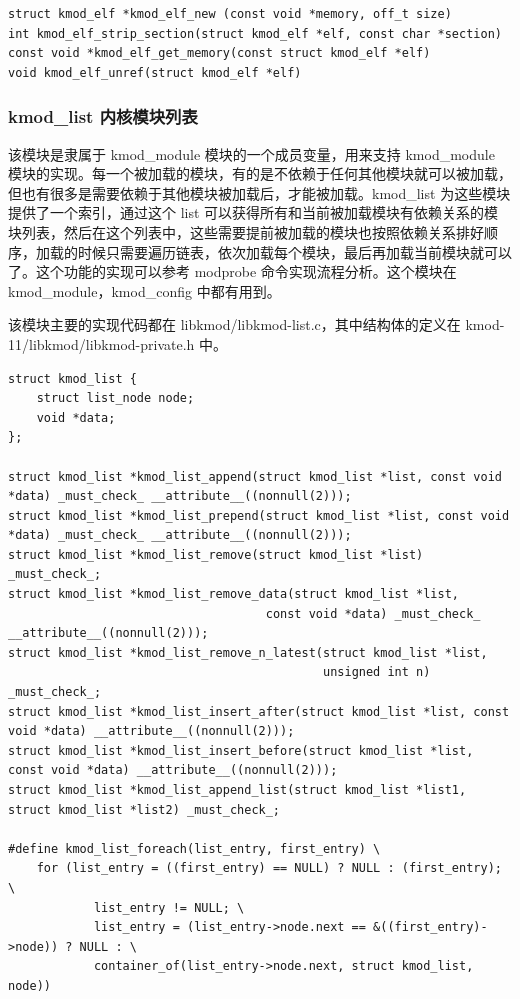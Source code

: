 \documentclass[11pt,a4paper]{article}
\begin{document}
{\begin{shaded}\begin{verbatim}
struct kmod_elf *kmod_elf_new (const void *memory, off_t size)
int kmod_elf_strip_section(struct kmod_elf *elf, const char *section)
const void *kmod_elf_get_memory(const struct kmod_elf *elf)
void kmod_elf_unref(struct kmod_elf *elf)
\end{verbatim}\end{shaded}}
\subsubsection{kmod\_list 内核模块列表}

该模块是隶属于 kmod\_module 模块的一个成员变量，用来支持 kmod\_module
模块的实现。每一个被加载的模块，有的是不依赖于任何其他模块就可以被加载，但也有很多是需要依赖于其他模块被加载后，才能被加载。kmod\_list
为这些模块提供了一个索引，通过这个 list
可以获得所有和当前被加载模块有依赖关系的模块列表，然后在这个列表中，这些需要提前被加载的模块也按照依赖关系排好顺序，加载的时候只需要遍历链表，依次加载每个模块，最后再加载当前模块就可以了。这个功能的实现可以参考
modprobe 命令实现流程分析。这个模块在 kmod\_module，kmod\_config
中都有用到。

该模块主要的实现代码都在 libkmod/libkmod-list.c，其中结构体的定义在
kmod-11/libkmod/libkmod-private.h 中。

{\begin{shaded}\begin{verbatim}
struct kmod_list {
    struct list_node node;
    void *data;
};

struct kmod_list *kmod_list_append(struct kmod_list *list, const void *data) _must_check_ __attribute__((nonnull(2)));
struct kmod_list *kmod_list_prepend(struct kmod_list *list, const void *data) _must_check_ __attribute__((nonnull(2)));
struct kmod_list *kmod_list_remove(struct kmod_list *list) _must_check_;
struct kmod_list *kmod_list_remove_data(struct kmod_list *list,
                                    const void *data) _must_check_ __attribute__((nonnull(2)));
struct kmod_list *kmod_list_remove_n_latest(struct kmod_list *list,
                                            unsigned int n) _must_check_;
struct kmod_list *kmod_list_insert_after(struct kmod_list *list, const void *data) __attribute__((nonnull(2)));
struct kmod_list *kmod_list_insert_before(struct kmod_list *list, const void *data) __attribute__((nonnull(2)));
struct kmod_list *kmod_list_append_list(struct kmod_list *list1, struct kmod_list *list2) _must_check_;

#define kmod_list_foreach(list_entry, first_entry) \
    for (list_entry = ((first_entry) == NULL) ? NULL : (first_entry); \
            list_entry != NULL; \
            list_entry = (list_entry->node.next == &((first_entry)->node)) ? NULL : \
            container_of(list_entry->node.next, struct kmod_list, node))
\end{verbatim}\end{shaded}}
\end{document}

